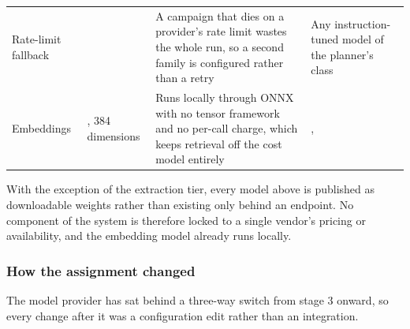 \begin{table}[H]
\begin{tabularx}{\textwidth}{@{}>{\hsize}Y>{\hsize}Y>{\hsize}Y>{\hsize}Y@{}}
    \addlinespace
    Rate-limit fallback &  & A campaign that dies on a provider's rate limit wastes the whole run, so a second family is configured rather than a retry & Any instruction-tuned model of the planner's class \\
    \addlinespace
    Embeddings & , 384 dimensions & Runs locally through ONNX with no tensor framework and no per-call charge, which keeps retrieval off the cost model entirely & ,  \\
    \bottomrule
  \end{tabularx}
\end{table}

With the exception of the extraction tier, every model above is published as
downloadable weights rather than existing only behind an endpoint. No component
of the system is therefore locked to a single vendor's pricing or availability,
and the embedding model already runs locally.

\subsubsection{How the assignment changed}

The model provider has sat behind a three-way switch from stage 3 onward, so
every change after it was a configuration edit rather than an integration.

